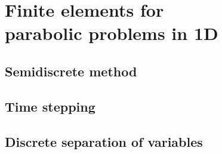\chapter[Finite elements for parabolic problems]{Finite elements for \\
parabolic problems in 1D}

\section{Semidiscrete method}

\section{Time stepping}

\section{Discrete separation of variables}
